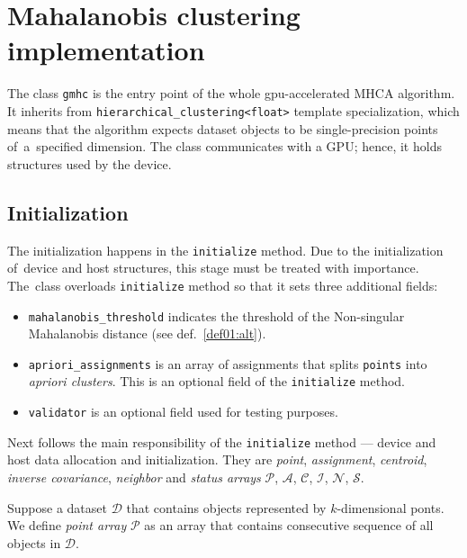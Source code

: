 \section{Mahalanobis clustering implementation}

The class \texttt{gmhc} is the entry point of the whole gpu-accelerated MHCA algorithm. It inherits from \texttt{hierarchical\_clustering<float>} template specialization, which means that the algorithm expects dataset objects to be single-precision points of~a~specified dimension. The class communicates
with a GPU; hence, it holds structures used by the device.

\subsection{Initialization}

The initialization happens in the \texttt{initialize} method. Due to the initialization of~device and host structures, this stage must be treated with importance.
The~class overloads \texttt{initialize} method so that it sets three additional fields:
\begin{itemize}
	\item \texttt{mahalanobis\_threshold} indicates the threshold of the Non-singular Mahalanobis distance (see def.~\ref{def01:alt}).
	
	\item\texttt{apriori\_assignments}  is an array of assignments that splits \texttt{points} into \emph{apriori clusters}. This is an optional field of the \texttt{initialize} method.
	
	\item \texttt{validator} is an optional field used for testing purposes.
\end{itemize}

Next follows the main responsibility of the \texttt{initialize} method --- device and host data allocation and initialization. They are \emph{point}, \emph{assignment}, \emph{centroid}, \emph{inverse covariance}, \emph{neighbor} and \emph{status arrays} $\mathcal{P}$, $\mathcal{A}$, $\mathcal{C}$, $\mathcal{I}$, $\mathcal{N}$, $\mathcal{S}$. 

\begin{defn}
	Suppose a dataset $\mathcal{D}$ that contains objects represented by $k$-di\-men\-si\-onal ponts. We define \emph{point array} $\mathcal{P}$ as an array that contains consecutive sequence of all objects in $\mathcal{D}$.
	\label{def03:point}
\end{defn}

